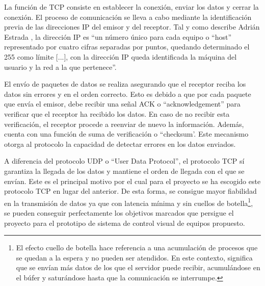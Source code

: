 La función de TCP consiste en establecer la conexión, enviar los datos y cerrar la conexión. El proceso de comunicación se lleva a cabo mediante la identificación previa de las direcciones IP del emisor y del receptor. Tal y como describe Adrián Estrada \citep{corona2004protocolos}, la dirección IP es ``un número único para cada equipo o ``host'' representado por cuatro cifras separadas por puntos, quedando determinado el 255 como límite [...], con la dirección IP queda identificada la máquina del usuario y la red a la que pertenece''.


El envío de paquetes de datos se realiza asegurando que el receptor reciba los datos sin errores y en el orden correcto.  Esto es debido a que por cada paquete que envía el emisor, debe recibir una señal ACK o ``acknowledgement'' para verificar que el receptor ha recibido los datos. En caso de no recibir esta verificación, el receptor procede a reenviar de nuevo la información. Además, cuenta con una función de suma de verificación o ``checksum'. Este mecanismo otorga al protocolo la capacidad de detectar errores en los datos enviados.

A diferencia del protocolo UDP o ``User Data Protocol'', el protocolo TCP sí garantiza la llegada de los datos y mantiene el orden de llegada con el que se envían.
Este es el principal motivo por el cual para el proyecto se ha escogido este protocolo TCP en lugar del anterior. De esta forma, se consigue mayor fiabilidad en la transmisión de datos ya que con latencia mínima y sin cuellos de botella\footnote{El efecto cuello de botella hace referencia a una acumulación de procesos que se quedan a la espera y no pueden ser atendidos. En este contexto, significa que se envían más datos de los que el servidor puede recibir, acumulándose en el búfer y saturándose hasta que la comunicación se interrumpe.}, se pueden conseguir perfectamente los objetivos marcados que persigue el proyecto para el prototipo de sistema de control visual de equipos propuesto.\par

